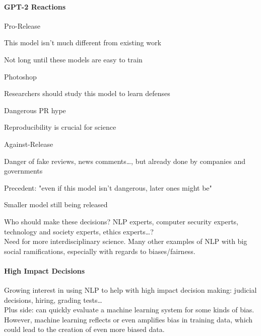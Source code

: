 \documentclass[10pt]{report}
\begin{document}
\paragraph{GPT-2 Reactions} Pro-Release \begin{list}{}{}
	\item This model isn't much different from existing work
	\item Not long until these models are easy to train
	\item Photoshop
	\item Researchers should study this model to learn defenses
	\item Dangerous PR hype
	\item Reproducibility is crucial for science
\end{list}
Against-Release \begin{list}{}{}
	\item Danger of fake reviews, news comments\ldots, but already done by companies and governments
	\item Precedent: "even if this model isn't dangerous, later ones might be"
	\item Smaller model still being released
\end{list}
Who should make these decisions? NLP experts, computer security experts, technology and society experts, ethics experts\ldots?\\
Need for more interdisciplinary science. Many other examples of NLP with big social ramifications, especially with regards to biases/fairness.
\paragraph{High Impact Decisions} Growing interest in using NLP to help with high impact decision making: judicial decisions, hiring, grading tests\ldots\\
Plus side: can quickly evaluate a machine learning system for some kinds of bias. However, machine learning reflects or even amplifies bias in training data, which could lead to the creation of even more biased data.
\end{document}
